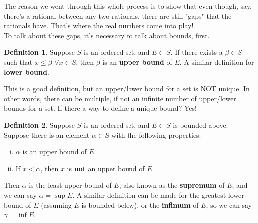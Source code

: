 \documentclass{article}
\theoremstyle{definition}
\newtheorem{definition}{Definition}[section]
\begin{document}
\begin{section}
\noindent The reason we went through this whole process is to show that even though, say, there's a rational between any two rationals, there are still "gaps" that the rationals have. That's where the real numbers come into play! \\
To talk about these gaps, it's necessary to talk about bounds, first. 

\begin{definition}
Suppose $S$ is an ordered set, and $E \subset S$. If there exists a $\beta \in S$ such that $x \leq \beta$ $\forall x \in S$, then $\beta$ is an \textbf{upper bound} of $E$. A similar definition for \textbf{lower bound}.
\end{definition}

\noindent This is a good definition, but an upper/lower bound for a set is NOT unique. In other words, there can be multiple, if not an infinite number of upper/lower bounds for a set. If there a way to define a unique bound? Yes!
\begin{definition}
Suppose $S$ is an ordered set, and $E \subset S$ is bounded above. Suppose there is an element $\alpha \in S$ with the following properties:
\begin{enumerate}[(i)]
\item $\alpha$ is an upper bound of $E$.
\item If $x < \alpha$, then $x$ is \textbf{not} an upper bound of $E$.
\end{enumerate}
Then $\alpha$ is the least upper bound of $E$, also known as the \textbf{supremum} of $E$, and we can say $\alpha = \sup E$. \newline
A similar definition can be made for the greatest lower bound of $E$ (assuming $E$ is bounded below), or the \textbf{infimum} of $E$, so we can say $\gamma = \inf E$.

\end{definition}

\end{section}

 
 
 
\end{document}
